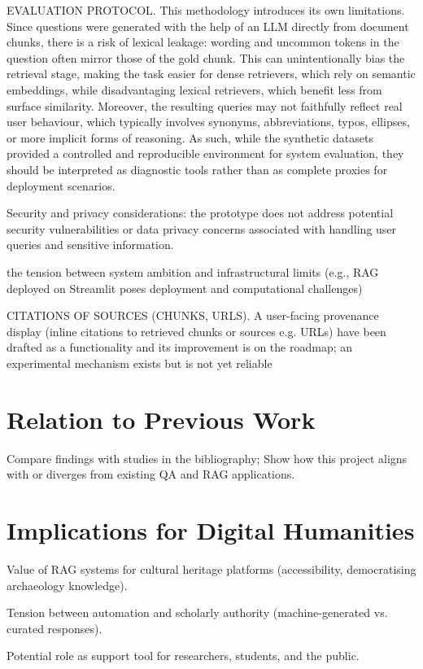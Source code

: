 \begin{spacing}{1.5}
EVALUATION PROTOCOL.
This methodology introduces its own limitations. Since questions were generated with the help of an LLM directly from document chunks, there is a risk of lexical leakage: wording and uncommon tokens in the question often mirror those of the gold chunk. This can unintentionally bias the retrieval stage, making the task easier for dense retrievers, which rely on semantic embeddings, while disadvantaging lexical retrievers, which benefit less from surface similarity. Moreover, the resulting queries may not faithfully reflect real user behaviour, which typically involves synonyms, abbreviations, typos, ellipses, or more implicit forms of reasoning. As such, while the synthetic datasets provided a controlled and reproducible environment for system evaluation, they should be interpreted as diagnostic tools rather than as complete proxies for deployment scenarios.

Security and privacy considerations: the prototype does not address potential security vulnerabilities or data privacy concerns associated with handling user queries and sensitive information.

the tension between system ambition and infrastructural limits (e.g., RAG deployed on Streamlit poses deployment and computational challenges)

CITATIONS OF SOURCES (CHUNKS, URLS).
A user-facing provenance display (inline citations to retrieved chunks or sources e.g. URLs) have been drafted as a functionality and its improvement is on the roadmap; an experimental mechanism exists but is not yet reliable

\section{Relation to Previous Work}
Compare findings with studies in the bibliography; Show how this project aligns with or diverges from existing QA and RAG applications.

\section{Implications for Digital Humanities}
Value of RAG systems for cultural heritage platforms (accessibility, democratising archaeology knowledge).

Tension between automation and scholarly authority (machine-generated vs. curated responses).

Potential role as support tool for researchers, students, and the public.

\end{spacing}